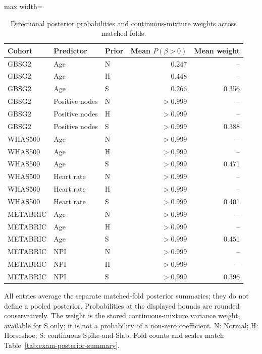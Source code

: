 \begin{table}[htbp]
\centering
\begingroup\singlespacing\footnotesize
\setlength{\tabcolsep}{3pt}
\caption{Directional posterior probabilities and continuous-mixture weights across matched folds.}\label{tab:exam-posterior-direction}
\begin{adjustbox}{max width=\textwidth}
\begin{tabular}{@{}lllrr@{}}
\toprule Cohort & Predictor & Prior & Mean $P(\beta>0)$ & Mean weight\\\midrule
GBSG2 & Age & N & 0.247 & --\\
GBSG2 & Age & H & 0.448 & --\\
GBSG2 & Age & S & 0.266 & 0.356\\
GBSG2 & Positive nodes & N & $>0.999$ & --\\
GBSG2 & Positive nodes & H & $>0.999$ & --\\
GBSG2 & Positive nodes & S & $>0.999$ & 0.388\\
WHAS500 & Age & N & $>0.999$ & --\\
WHAS500 & Age & H & $>0.999$ & --\\
WHAS500 & Age & S & $>0.999$ & 0.471\\
WHAS500 & Heart rate & N & $>0.999$ & --\\
WHAS500 & Heart rate & H & $>0.999$ & --\\
WHAS500 & Heart rate & S & $>0.999$ & 0.401\\
METABRIC & Age & N & $>0.999$ & --\\
METABRIC & Age & H & $>0.999$ & --\\
METABRIC & Age & S & $>0.999$ & 0.451\\
METABRIC & NPI & N & $>0.999$ & --\\
METABRIC & NPI & H & $>0.999$ & --\\
METABRIC & NPI & S & $>0.999$ & 0.396\\
\bottomrule
\end{tabular}
\end{adjustbox}
\par\smallskip
\begin{minipage}{\textwidth}
All entries average the separate matched-fold posterior summaries; they do not define a pooled posterior. Probabilities at the displayed bounds are rounded conservatively. The weight is the stored continuous-mixture variance weight, available for S only; it is not a probability of a non-zero coefficient. N: Normal; H: Horseshoe; S: continuous Spike-and-Slab. Fold counts and scales match Table~\ref{tab:exam-posterior-summary}.
\end{minipage}
\endgroup
\end{table}
